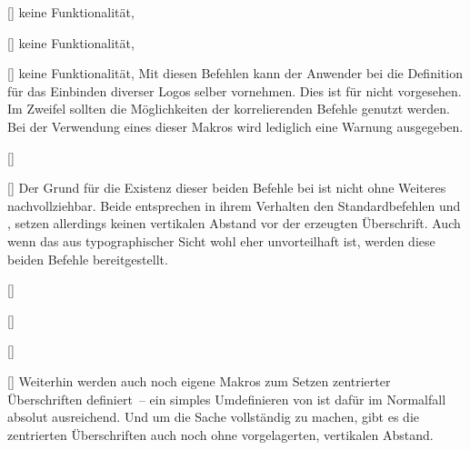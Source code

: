 \begin{Bundle*}{}
\begin{Declaration}{[]}{%
  keine Funktionalität, 
}
\begin{Declaration}{[]}{%
  keine Funktionalität, 
}
\begin{Declaration}{[]}{%
  keine Funktionalität, %
}
\printdeclarationlist%
%
Mit diesen Befehlen kann der Anwender bei  die Definition 
für das Einbinden diverser Logos selber vornehmen. Dies ist für \TUDScript 
nicht vorgesehen. Im Zweifel sollten die Möglichkeiten der korrelierenden 
Befehle genutzt werden. Bei der Verwendung eines dieser Makros wird lediglich 
eine Warnung ausgegeben.
\end{Declaration}
\end{Declaration}
\end{Declaration}

\begin{Declaration}{%
  []%
}
\begin{Declaration}{%
  []%
}
\printdeclarationlist%
%
Der Grund für die Existenz dieser beiden Befehle bei  ist 
nicht ohne Weiteres nachvollziehbar. Beide entsprechen in ihrem Verhalten den 
Standardbefehlen  und , setzen allerdings 
keinen vertikalen Abstand vor der erzeugten Überschrift. Auch wenn das aus 
typographischer Sicht wohl eher unvorteilhaft ist, werden diese beiden Befehle 
bereitgestellt.
\end{Declaration}
\end{Declaration}

\begin{Declaration}{%
  []%
}
\begin{Declaration}{%
  []%
}
\begin{Declaration}{%
  []%
}
\begin{Declaration}{%
  []%
}
\printdeclarationlist%
%
Weiterhin werden auch noch eigene Makros zum Setzen zentrierter Überschriften 
definiert~-- ein simples Umdefinieren von  ist dafür im 
Normalfall absolut ausreichend. Und um die Sache vollständig zu machen, gibt es 
die zentrierten Überschriften auch noch ohne vorgelagerten, vertikalen Abstand.
\end{Declaration}
\end{Declaration}
\end{Declaration}
\end{Declaration}


\end{Bundle*}
